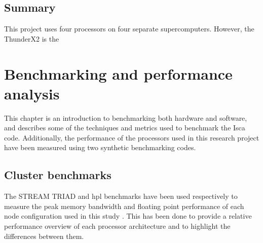 \documentclass[a4paper,11pt]{report}
\begin{document}
\section{Summary}
This project uses four processors on four separate supercomputers. However, the ThunderX2 is the


\chapter{Benchmarking and performance analysis}
This chapter is an introduction to benchmarking both hardware and software, and describes some of the techniques and metrics used to benchmark the Isca code. Additionally, the performance of the processors used in this research project have been measured using two synthetic benchmarking codes.
\section{Cluster benchmarks}
\label{sec:cluster-bench}
The STREAM TRIAD and \gls{hpl} benchmarks have been used respectively to measure the peak memory bandwidth and floating point performance of each node configuration used in this study \cite{mccalpin1995memory,dongarra2008linpack}. This has been done to provide a relative performance overview of each processor architecture and to highlight the differences between them. 
\end{document}
